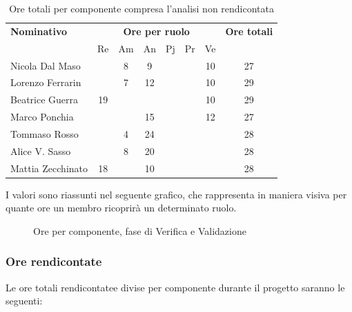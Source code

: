 \begin{table}[H]
	\centering
	\begin{tabular}{|l|c|c|c|c|c|c|c|}
		\hline
		\textbf{Nominativo} & 
		\multicolumn{6}{c|}{\textbf{Ore per ruolo}} & 
		\textbf{Ore totali} \\
		& Re & Am & An & Pj & Pr & Ve & \\
		\hline
		Nicola Dal Maso & & 8 & 9 & & & 10 & 27 \\
		Lorenzo Ferrarin & & 7 & 12 & & & 10 & 29 \\
		Beatrice Guerra & 19 & & & & & 10 & 29 \\
		Marco Ponchia & & & 15 & & & 12 & 27 \\
		Tommaso Rosso & & 4 & 24 & & & & 28 \\
		Alice V. Sasso & & 8 & 20 & & & & 28 \\
		Mattia Zecchinato & 18 & & 10 & & & & 28 \\
		\hline
	\end{tabular}
	\caption{Ore totali per componente compresa l'analisi non rendicontata}
\end{table}
I valori sono riassunti nel seguente grafico, che rappresenta in maniera visiva per quante ore un membro ricoprirà un determinato ruolo.
\begin{figure}[H]
	\centering
	\caption{Ore per componente, fase di Verifica e Validazione}
\end{figure}

\subsubsection{Ore rendicontate}
Le ore totali rendicontatee divise per componente durante il progetto saranno le seguenti:

